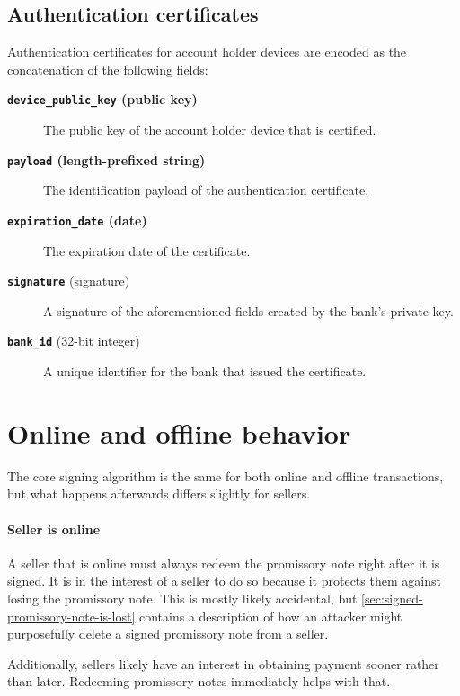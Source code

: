 \documentclass[12pt,a4paper]{article}
\begin{document}
\begin{multicols}{2}
	\subsection{Authentication certificates}

  	Authentication certificates for account holder devices are encoded as the concatenation of the following fields:

	\begin{description}
		\item[\textbf{\texttt{device\_public\_key} (public key)}] The public key of the account holder device that is certified.
		
		\item[\textbf{\texttt{payload} (length-prefixed string)}] The identification payload of the authentication certificate.
		
		\item[\textbf{\texttt{expiration\_date} (date)}] The expiration date of the certificate.
		
		\item[\textbf{\texttt{signature}} (signature)] A signature of the aforementioned fields created by the bank's private key.
		
		\item[\textbf{\texttt{bank\_id}} (32-bit integer)] A unique identifier for the bank that issued the certificate.
	\end{description}

	\section{Online and offline behavior}

	The core signing algorithm is the same for both online and offline transactions, but what happens afterwards differs slightly for sellers.

	\paragraph{Seller is online}
	
	A seller that is online must always redeem the promissory note right after it is signed. It is in the interest of a seller to do so because it protects them against losing the promissory note. This is mostly likely accidental, but \autoref{sec:signed-promissory-note-is-lost} contains a description of how an attacker might purposefully delete a signed promissory note from a seller.

	Additionally, sellers likely have an interest in obtaining payment sooner rather than later. Redeeming promissory notes immediately helps with that.


\end{multicols}
\end{document}
